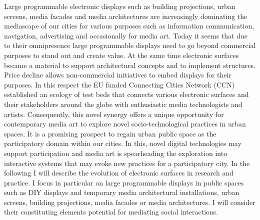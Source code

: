 Large programmable electronic displays such as building projections, urban screens, media facades and media architectures are increasingly dominating the mediascape of our cities for various purposes such as information communication, navigation, advertising and occasionally for media art. 
Today it seems that due to their omnipresence large programmable displays need to go beyond commercial purposes to stand out and create value.
At the same time electronic surfaces became a material to support architectural concepts and to implement structures. Price decline allows non-commercial initiatives to embed displays for their purposes. 
In this respect the EU funded Connecting Cities Network (CCN)  established an ecology of test beds that connects various electronic surfaces and their stakeholders around the globe with enthusiastic media technologists and artists. 
Consequently, this novel synergy offers a unique opportunity for contemporary media art to explore novel socio-technological practices in urban spaces. 
It is a promising prospect to regain urban public space as the participatory domain within our cities. 
In this, novel digital technologies may support participation and media art is spearheading the exploration into interactive systems that may evoke new practices for a participatory city. 
In the following I will describe the evolution of electronic surfaces in research and practice.
I focus in particular on large programmable displays in public spaces such as DIY displays and temporary media architectural installations, urban screens, building projections, media facades or media architectures. I will consider their constituting elements potential for mediating social interactions.


